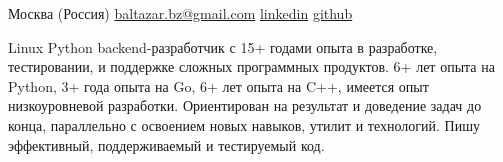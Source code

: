 \documentclass[unicode, 10pt, a4paper, oneside, fleqn]{article}
\begin{document}
\sloppy  %


\nobreakvspace{0.3em}  %

Москва (Россия)
\sbull
\href{mailto:baltazar.bz@gmail.com}{baltazar.bz\mbox{}@\mbox{}gmail.com}\sbull
\href{http://ru.linkedin.com/pub/yuri-bochkarev/21/3a9/555}{linkedin}
\sbull
\href{https://github.com/balta2ar}{github}


\noindent
Linux Python backend-разработчик с 15+ годами опыта в разработке,
    тестировании, и поддержке сложных программных продуктов. 6+ лет опыта на
    Python, 3+ года опыта на Go, 6+ лет опыта на C++, имеется опыт низкоуровневой
    разработки. Ориентирован на результат и доведение задач до конца,
    параллельно с освоением новых навыков, утилит и технологий. Пишу
    эффективный, поддерживаемый и тестируемый код.


\end{document}
